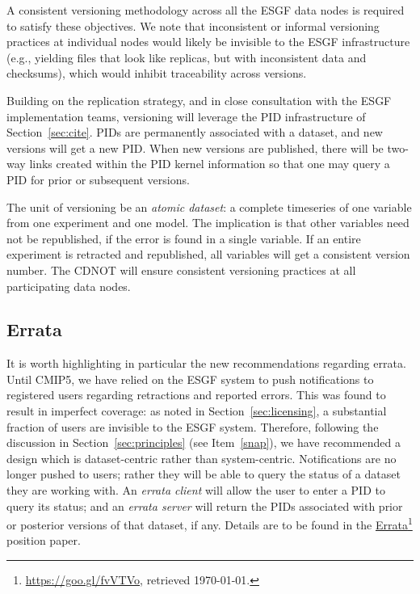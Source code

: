 \documentclass[gmd,manuscript]{copernicus}
\newcommand{\urlref}[2] {\href{#1}{#2}\footnote{\url{#1}, retrieved \today.}}
\begin{document}
A consistent versioning methodology across all the ESGF data nodes is
required to satisfy these objectives. We note that inconsistent or
informal versioning practices at individual nodes would likely be
invisible to the ESGF infrastructure (e.g., yielding files that look
like replicas, but with inconsistent data and checksums), which would
inhibit traceability across versions.

Building on the replication strategy, and in close consultation with
the ESGF implementation teams, versioning will leverage the PID
infrastructure of Section~\ref{sec:cite}. PIDs are permanently
associated with a dataset, and new versions will get a new PID. When
new versions are published, there will be two-way links created within
the PID kernel information so that one may query a PID for prior or
subsequent versions.

The unit of versioning be an \emph{atomic dataset}: a complete
timeseries of one variable from one experiment and one model. The
implication is that other variables need not be republished, if the
error is found in a single variable. If an entire experiment is
retracted and republished, all variables will get a consistent version
number. The CDNOT will ensure consistent versioning practices at all
participating data nodes.

\subsection{Errata}
\label{sec:errata}

It is worth highlighting in particular the new recommendations
regarding errata. Until CMIP5, we have relied on the ESGF system to
push notifications to registered users regarding retractions and
reported errors. This was found to result in imperfect coverage: as
noted in Section~\ref{sec:licensing}, a substantial fraction of users
are invisible to the ESGF system. Therefore, following the discussion
in Section~\ref{sec:principles} (see Item~\ref{snap}), we have
recommended a design which is dataset-centric rather than
system-centric. Notifications are no longer pushed to users; rather
they will be able to query the status of a dataset they are working
with. An \emph{errata client} will allow the user to enter a PID to
query its status; and an \emph{errata server} will return the PIDs
associated with prior or posterior versions of that dataset, if any.
Details are to be found in the \urlref{https://goo.gl/fvVTVo}{Errata}
position paper.
\end{document}

